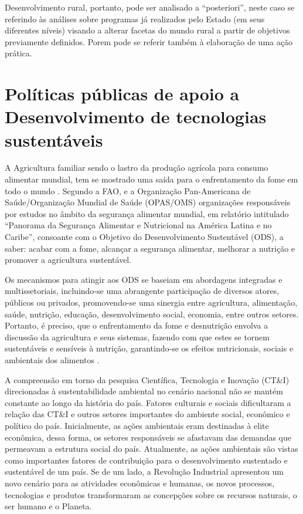 \begin{citacao}
[...] Desenvolvimento rural, portanto, pode ser analisado a “posteriori”, neste caso se referindo às análises sobre programas já realizados pelo Estado (em seus diferentes níveis) visando a alterar facetas do mundo rural a partir de objetivos previamente definidos. Porem pode se referir também à elaboração de uma ação prática.
\end{citacao}

\section{Políticas públicas de apoio a Desenvolvimento de tecnologias sustentáveis}

A Agricultura familiar sendo o lastro da produção agrícola para consumo alimentar mundial, tem se mostrado uma saída para o enfrentamento da fome em todo o mundo \cite{fao_innovation_2014}. Segundo a FAO, e a Organização Pan-Americana de Saúde/Organização Mundial de Saúde (OPAS/OMS) \cite{fao_panorama_2017} organizações responsáveis por estudos no âmbito da segurança alimentar mundial, em relatório intitulado “Panorama da Segurança Alimentar e Nutricional na América Latina e no Caribe”, consoante com o Objetivo do Desenvolvimento Sustentável (ODS), a saber: acabar com a fome, alcançar a segurança alimentar, melhorar a nutrição e promover a agricultura sustentável. 

Os mecanismos para atingir aos ODS se baseiam em abordagens integradas e multissetoriais, incluindo-se uma abrangente participação de diversos atores, públicos ou privados, promovendo-se uma sinergia entre agricultura, alimentação, saúde, nutrição, educação, desenvolvimento social, economia, entre outros setores. Portanto, é preciso, que o enfrentamento da fome e desnutrição envolva a discussão da agricultura e seus sistemas, fazendo com que estes se tornem sustentáveis e sensíveis à nutrição, garantindo-se os efeitos nutricionais, sociais e ambientais dos alimentos \cite{silva_agenda_2018}.


A compreensão em torno da pesquisa Científica, Tecnologia e Inovação (CT\&I) direcionadas à sustentabilidade ambiental no cenário nacional não se mantém constante ao longo da história do país. Fatores culturais e sociais dificultaram a relação das CT\&I e outros setores importantes do ambiente social, econômico e político do país. Inicialmente, as ações ambientais eram destinadas à elite econômica, dessa forma, os setores responsáveis se afastavam das demandas que permeavam a estrutura social do país. Atualmente, as ações ambientais são vistas como importantes fatores de contribuição para o desenvolvimento sustentado e sustentável de um país. Se de um lado, a Revolução Industrial apresentou um novo cenário para as atividades econômicas e humanas, os novos processos, tecnologias e produtos transformaram as concepções sobre os recursos naturais, o ser humano e o Planeta.

